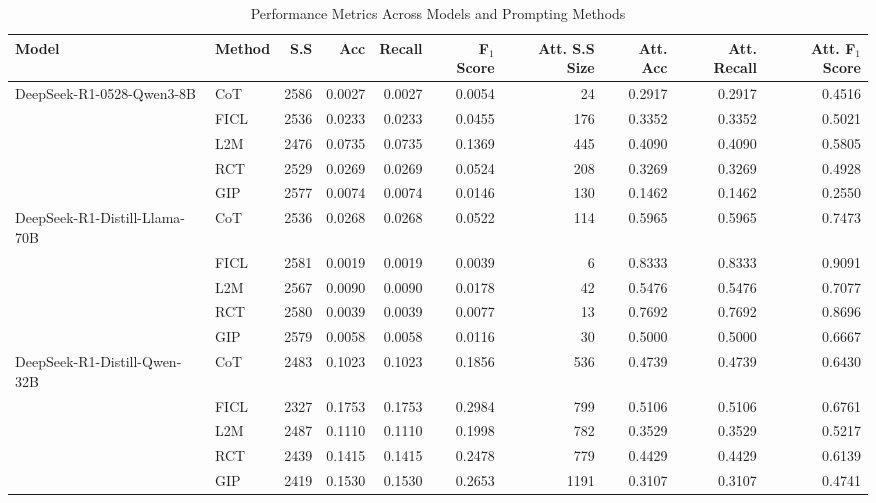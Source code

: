 \documentclass[conference]{IEEEtran}
\begin{document}
\begin{table}[t]
\centering
\caption{Performance Metrics Across Models and Prompting Methods}
\label{tab:aaai_perf}
\begin{tabular}{@{} p{3.5cm} l r r r r r r r r@{}}
\toprule
Model & Method & S.S & Acc & Recall & F$_1$ Score & Att. S.S Size & Att. Acc & Att. Recall & Att. F$_1$ Score \\
\midrule
DeepSeek-R1-0528-Qwen3-8B & CoT & 2586 & 0.0027 & 0.0027 & 0.0054 & 24 & 0.2917 & 0.2917 & 0.4516 \\
                          & FICL & 2536 & 0.0233 & 0.0233 & 0.0455 & 176 & 0.3352 & 0.3352 & 0.5021 \\
                          & L2M  & 2476 & 0.0735 & 0.0735 & 0.1369 & 445 & 0.4090 & 0.4090 & 0.5805 \\
                          & RCT  & 2529 & 0.0269 & 0.0269 & 0.0524 & 208 & 0.3269 & 0.3269 & 0.4928 \\
                          & GIP  & 2577 & 0.0074 & 0.0074 & 0.0146 & 130 & 0.1462 & 0.1462 & 0.2550 \\ \hline
\addlinespace
DeepSeek-R1-Distill-Llama-70B & CoT & 2536 & 0.0268 & 0.0268 & 0.0522 & 114 & 0.5965 & 0.5965 & 0.7473 \\
                          & FICL & 2581 & 0.0019 & 0.0019 & 0.0039 & 6 & 0.8333 & 0.8333 & 0.9091 \\
                          & L2M  & 2567 & 0.0090 & 0.0090 & 0.0178 & 42 & 0.5476 & 0.5476 & 0.7077 \\
                          & RCT  & 2580 & 0.0039 & 0.0039 & 0.0077 & 13 & 0.7692 & 0.7692 & 0.8696 \\
                          & GIP  & 2579 & 0.0058 & 0.0058 & 0.0116 & 30 & 0.5000 & 0.5000 & 0.6667 \\ \hline
\addlinespace
DeepSeek-R1-Distill-Qwen-32B & CoT & 2483 & 0.1023 & 0.1023 & 0.1856 & 536 & 0.4739 & 0.4739 & 0.6430 \\
                          & FICL & 2327 & 0.1753 & 0.1753 & 0.2984 & 799 & 0.5106 & 0.5106 & 0.6761 \\
                          & L2M  & 2487 & 0.1110 & 0.1110 & 0.1998 & 782 & 0.3529 & 0.3529 & 0.5217 \\
                          & RCT  & 2439 & 0.1415 & 0.1415 & 0.2478 & 779 & 0.4429 & 0.4429 & 0.6139 \\
                          & GIP  & 2419 & 0.1530 & 0.1530 & 0.2653 & 1191 & 0.3107 & 0.3107 & 0.4741 \\ \hline

\end{tabular}
\end{table}
\end{document}
